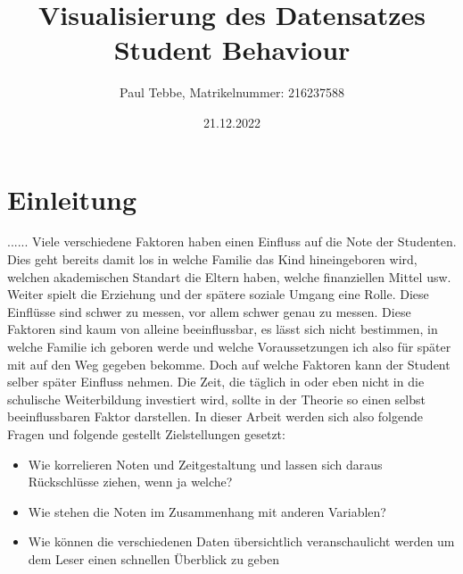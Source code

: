 \documentclass[usegeometry=true]{scrartcl}
\begin{document}
\subject{Projektbericht zum Modul Information Retrieval und Visualisierung Sommersemester 2022}
\title{Visualisierung des Datensatzes Student Behaviour}
\author{Paul Tebbe, Matrikelnummer: 216237588}%
\date{21.12.2022}
\maketitle%
\pagebreak

\section{Einleitung}
\label{Einleitung}
......
Viele verschiedene Faktoren haben einen Einfluss auf die Note der Studenten. Dies geht bereits damit los in welche Familie das Kind hineingeboren wird, welchen akademischen Standart die Eltern haben, welche finanziellen Mittel usw. Weiter spielt die Erziehung und der spätere soziale Umgang eine Rolle. \cite{Earthman}
Diese Einflüsse sind schwer zu messen, vor allem schwer genau zu messen. Diese Faktoren sind kaum von alleine beeinflussbar, es lässt sich nicht bestimmen, in welche Familie ich geboren werde und welche Voraussetzungen ich also für später mit auf den Weg gegeben bekomme. Doch auf welche Faktoren kann der Student selber später Einfluss nehmen. Die Zeit, die täglich in oder eben nicht in die schulische Weiterbildung investiert wird, sollte in der Theorie so einen selbst beeinflussbaren Faktor darstellen. 
In dieser Arbeit werden sich also folgende Fragen und folgende gestellt Zielstellungen gesetzt:

\begin{itemize}
\item Wie korrelieren Noten und Zeitgestaltung und lassen sich daraus Rückschlüsse ziehen, wenn ja welche? 
\item Wie stehen die Noten im Zusammenhang mit anderen Variablen?
\item Wie können die verschiedenen Daten übersichtlich veranschaulicht werden um dem Leser einen schnellen Überblick zu geben
\end{itemize}
\end{document}
